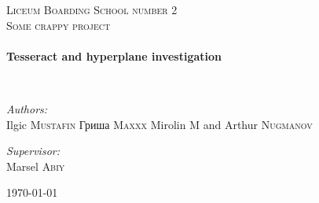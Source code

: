 \begin{titlepage}
\begin{center}
\selectfont

\textsc{\LARGE Liceum Boarding School number 2}\\[1.5cm]

\textsc{\Large Some crappy project}\\[0.5cm]

\HRule \\[0.4cm]
{ \huge \bfseries Tesseract and hyperplane investigation\\[0.4cm] }

\HRule \\[1.5cm]

\noindent
\begin{minipage}{0.4\textwidth}
\begin{flushleft} \large
\emph{Authors:}\\
Ilgic \textsc{Mustafin} \newline
{}\selectfont
Гриша \textsc{Maxxx} \newline %
\selectfont %
Mirolin \textsc{M} 
and \newline
Arthur \textsc{Nugmanov} 
\end{flushleft}
\end{minipage}%
\begin{minipage}{0.4\textwidth}
\begin{flushright} \large
\emph{Supervisor:} \\
Marsel \textsc{Abiy}
\end{flushright}
\end{minipage}

\vfill

{\large \today}

\end{center}
\end{titlepage}
